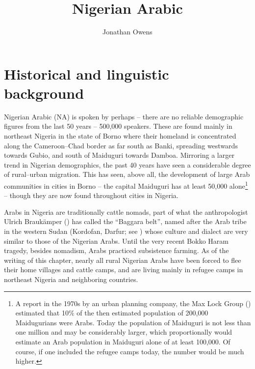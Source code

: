 \documentclass[output=paper]{langsci/langscibook}
\author{Jonathan Owens\affiliation{University of Bayreuth}}
\title{Nigerian Arabic}
\begin{document}
 

\section{
Historical and linguistic background
}

Nigerian Arabic (NA) is spoken by perhaps – there are no reliable demographic figures from the last 50 years – 500,000 speakers. These are found mainly in northeast Nigeria in the state of Borno where their homeland is concentrated along the Cameroon--Chad border as far south as Banki, spreading westwards towards Gubio, and south of Maiduguri towards Damboa. Mirroring a larger trend in Nigerian demographics, the past 40 years have seen a considerable degree of rural–urban migration. This has seen, above all, the development of large Arab communities in cities in Borno – the capital Maiduguri has at least 50,000 alone\footnote{A report in the 1970s by an urban planning company, the Max Lock Group (\citeyear{MaxLockGroup1976}) estimated that 10\% of the then estimated population of 200,000 Maidugurians were Arabs. Today the population of Maiduguri is not less than one million and may be considerably larger, which proportionally would estimate an Arab population in Maiduguri alone of at least 100,000. Of course, if one included the refugee camps today, the number would be much higher.} – though they are now found throughout cities in Nigeria. 

Arabs in Nigeria are traditionally cattle nomads, part of what the anthropologist Ulrich Braukämper (\citeyear{Braukämper1994}) has called the “Baggara belt”, named after the Arab tribe in the western Sudan (Kordofan, Darfur; see \citealt{Manfredi2010}) whose culture and dialect are very similar to those of the Nigerian Arabs. Until the very recent Bokko Haram tragedy, besides nomadism, Arabs practiced subsistence farming. As of the writing of this chapter, nearly all rural Nigerian Arabs have been forced to flee their home villages and cattle camps, and are living mainly in refugee camps in northeast Nigeria and neighboring countries. 
\end{document}

